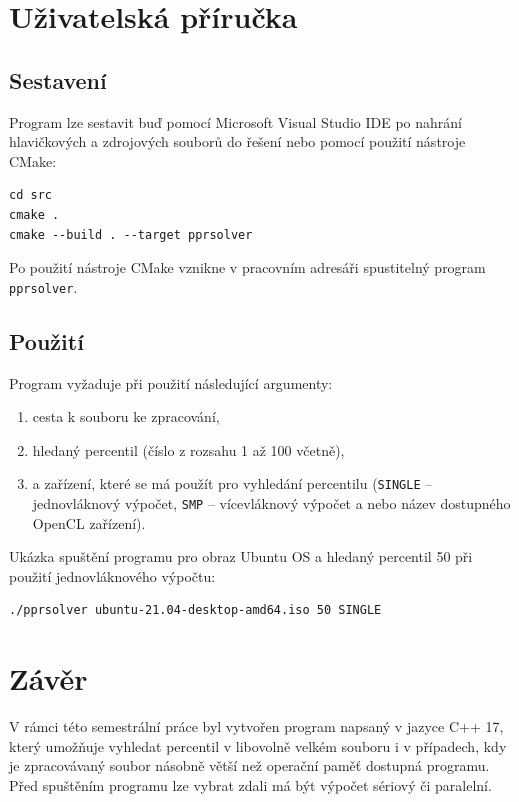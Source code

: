 \documentclass[12pt, a4paper]{article}
\let\oldsection\section
\renewcommand\section{\clearpage\oldsection}
\begin{document}
\section{Uživatelská příručka}
\subsection{Sestavení}
Program lze sestavit buď pomocí Microsoft Visual Studio IDE po nahrání hlavičkových a zdrojových souborů do řešení nebo pomocí použití nástroje CMake: 

\begin{lstlisting}
cd src
cmake .
cmake --build . --target pprsolver
\end{lstlisting}

Po použití nástroje CMake vznikne v pracovním adresáři spustitelný program \texttt{pprsolver}.

\subsection{Použití}
Program vyžaduje při použití následující argumenty:

\begin{enumerate}
    \item cesta k souboru ke zpracování,
    \item hledaný percentil (číslo z rozsahu 1 až 100 včetně),
    \item a zařízení, které se má použít pro vyhledání percentilu (\texttt{SINGLE} -- jednovláknový výpočet, \texttt{SMP} -- vícevláknový výpočet a nebo název dostupného OpenCL zařízení).
\end{enumerate}

Ukázka spuštění programu pro obraz Ubuntu OS a hledaný percentil 50 při použití jednovláknového výpočtu:
\begin{lstlisting}
./pprsolver ubuntu-21.04-desktop-amd64.iso 50 SINGLE
\end{lstlisting}

\section{Závěr}

V rámci této semestrální práce byl vytvořen program napsaný v jazyce C++ 17, který umožňuje vyhledat percentil v libovolně velkém souboru i v případech, kdy je zpracovávaný soubor násobně větší než operační paměť dostupná programu.
Před spuštěním programu lze vybrat zdali má být výpočet sériový či paralelní.
\end{document}
